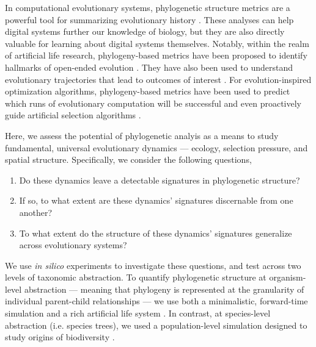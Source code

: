 In computational evolutionary systems, phylogenetic structure metrics are a powerful tool for summarizing evolutionary history \citep{dolson2020interpreting}.
These analyses can help digital systems further our knowledge of biology, but they are also directly valuable for learning about digital systems themselves.
Notably, within the realm of artificial life research, phylogeny-based metrics have been proposed to identify hallmarks of open-ended evolution \citep{dolsonMODESToolboxMeasurements2019}.
They have also been used to understand evolutionary trajectories that lead to outcomes of interest \citep{lenskiEvolutionaryOriginComplex2003,lalejiniEvolutionaryOriginsPhenotypic2016,johnsonEndosymbiosisBustInfluence2022a}.
For evolution-inspired optimization algorithms, phylogeny-based metrics have been used to predict which runs of evolutionary computation will be successful \citep{hernandezWhatCanPhylogenetic2022a,shahbandeganUntanglingPhylogeneticDiversity2022a} and even proactively guide artificial selection algorithms \citep{lalejini2024phylogeny,burke2003increased}.

Here, we assess the potential of phylogenetic analyis as a means to study fundamental, universal evolutionary dynamics --- ecology, selection pressure, and spatial structure.
Specifically, we consider the following questions,
\begin{enumerate}
  \item Do these dynamics leave a detectable signatures in phylogenetic structure?
  \item If so, to what extent are these dynamics' signatures discernable from one another?
  \item To what extent do the structure of these dynamics' signatures generalize across evolutionary systems?
\end{enumerate}

We use \textit{in silico} experiments to investigate these questions, and test across two levels of taxonomic abstraction.
To quantify phylogenetic structure at organism-level abstraction --- meaning that phylogeny is represented at the granularity of individual parent-child relationships --- we use both a minimalistic, forward-time simulation and a rich artificial life system \citep{ofria2004avida}.
In contrast, at species-level abstraction (i.e. species trees), we used a population-level simulation designed to study origins of biodiversity \citep{hagen2021gen3sis}.

